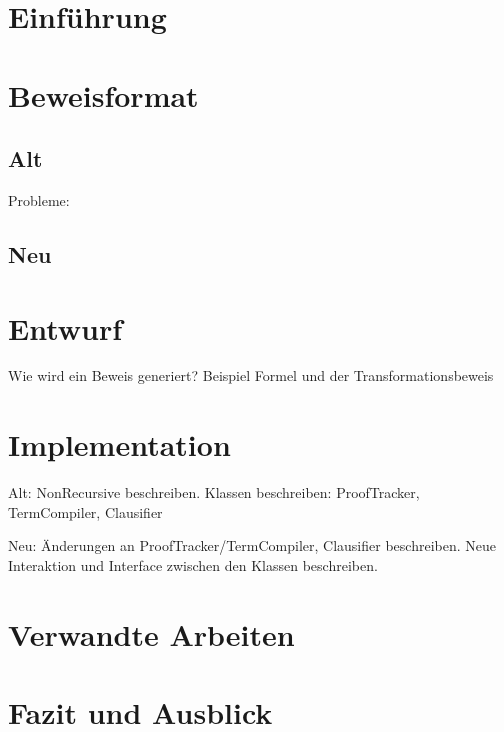 \documentclass[a4paper]{article}
\title{}
\author{Markus Pomrehn}
\begin{document}
\section{Einführung}

\section{Beweisformat}
\subsection{Alt}

Probleme:

\subsection{Neu}

\section{Entwurf}

Wie wird ein Beweis generiert?
Beispiel Formel und der Transformationsbeweis

\section{Implementation}

Alt:
NonRecursive beschreiben.
Klassen beschreiben: ProofTracker, TermCompiler, Clausifier

Neu:
Änderungen an ProofTracker/TermCompiler, Clausifier beschreiben.
Neue Interaktion und Interface zwischen den Klassen beschreiben.


\section{Verwandte Arbeiten}

\section{Fazit und Ausblick}


\end{document}
